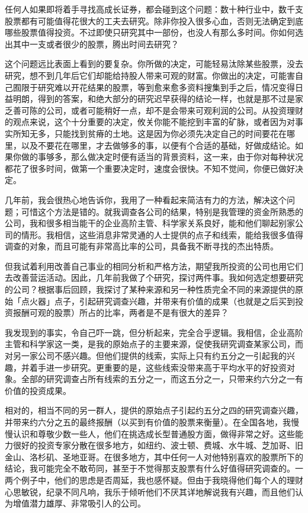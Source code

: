 \documentclass[UTF8,a4paper,zihao=-4,fontset = windows]{ctexart} %
\begin{document}
任何人如果即将着手寻找高成长证券，都会碰到这个问题：数十种行业中，数千支股票都有可能值得花很大的工夫去研究。除非你投入很多心血，否则无法确定到底哪些股票值得投资。不过即使只研究其中一部份，也没人有那么多时间。你如何选出其中一支或者很少的股票，腾出时间去研究？

这个问题远比表面上看到的要复杂。你所做的决定，可能轻易汰除某些股票，没去研究，想不到几年后它们却能给持股人带来可观的财富。你做出的决定，可能害自己囿限于研究难以开花结果的股票，等到愈来愈多资料搜集到手之后，情况变得日益明朗，得到的答案，和绝大部分的研究迟早获得的结论一样，也就是那不过是家乏善可陈的公司，或者可能稍好一点，却不是会带来可观利润的公司。从投资理财的观点来说，这个十分重要的决定，攸关你能不能挖到丰富的矿脉，或者因为对事实所知无多，只能找到贫瘠的土地。这是因为你必须先决定自己的时间要花在哪里，以及不要花在哪里，才去做够多的事，以便有个合适的基础，好做成结论。如果你做的事够多，那么做决定时便有适当的背景资料，这一来，由于你对每种状况都花了很多时间，做第一个重要决定时，速度会很快。不知不觉间，你便已做好决定。

几年前，我会很热心地告诉你，我用了一种看起来简洁有力的方法，解决这个问题；可惜这个方法是错的。就我调查各公司的结果，特别是我管理的资金所熟悉的公司，我和很多相当能干的企业高阶主管、科学家关系良好，能和他们聊起别家公司的情形。我相信，这些消息非常灵通的人士提供的点子和线索，能给我很多值得调查的对象，而且可能有非常高比率的公司，具备我不断寻找的杰出特质。

但我试着利用改善自己事业的相同分析和严格方法，期望我所投资的公司也用它们去改善营运活动。因此，几年前我做了个研究，探讨两件事。我如何选定想要研究的公司？根据事后回顾，我探讨了某种来源和另一种性质完全不同的来源提供的原始「点火器」点子，引起研究调查兴趣，并带来有价值的成果（也就是之后买到投资报酬可观的股票）所占的比率，两者是不是有很大的差异？

我发现到的事实，令自己吓一跳，但分析起来，完全合乎逻辑。我相信，企业高阶主管和科学家这一类，是我的原始点子的主要来源，促使我研究调查某家公司，而对另一家公司不感兴趣。但他们提供的线索，实际上只有约五分之一引起我的兴趣，并着手进一步研究。更重要的是，这些线索没带来高于平均水平的好投资对象。全部的研究调查占所有线索的五分之一，而这五分之一，只带来约六分之一有价值的投资成果。

相对的，相当不同的另一群人，提供的原始点子引起约五分之四的研究调查兴趣，并带来约六分之五的最终报酬（以买到有价值的股票来衡量）。在全国各地，我慢慢认识和尊敬少数一些人，他们在挑选成长型普通股方面，做得非常之好。这些能力很好的投资专家分散在很多地方，如纽约、波士顿、费城、水牛城、芝加哥、旧金山、洛杉矶、圣地亚哥。在很多地方，其中任何一人对他特别喜欢的股票所下的结论，我可能完全不敢苟同，甚至于不觉得那支股票有什么好值得研究调查的。一两个例子中，他们的思虑是否周延，我也感怀疑。但由于我晓得他们每个人的理财心思敏锐，纪录不同凡响，我乐于倾听他们不厌其详地解说我有兴趣，而且他们认为增值潜力雄厚、非常吸引人的公司。
\end{document}
